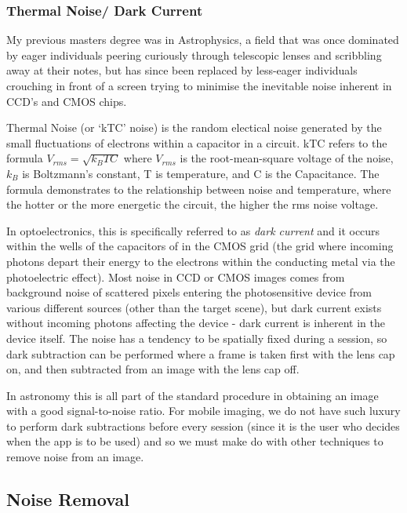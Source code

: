 \documentclass[11pt]{article} %
\begin{document}
{{\subsubsection{Thermal Noise/ Dark Current}

My previous masters degree was in Astrophysics, a field that was once dominated by eager individuals peering curiously through telescopic lenses and scribbling away at their notes, but has since been replaced by less-eager individuals crouching in front of a screen trying to minimise the inevitable noise inherent in CCD’s and CMOS chips.

Thermal Noise (or ‘kTC’ noise) is the random electical noise generated by the small fluctuations of electrons within a capacitor in a circuit. kTC refers to the formula \(V_{rms}=\sqrt{k_BTC}\) where \(V_{rms}\) is the root-mean-square voltage of the noise, \(k_B\) is Boltzmann’s constant, T is temperature, and C is the Capacitance. The formula demonstrates to the relationship between noise and temperature, where the hotter or the more energetic the circuit, the higher the rms noise voltage.

In optoelectronics, this is specifically referred to as {\it dark current} and it occurs within the wells of the capacitors of in the CMOS grid (the grid where incoming photons depart their energy to the electrons within the conducting metal via the photoelectric effect). Most noise in CCD or CMOS images comes from background noise of scattered pixels entering the photosensitive device from various different sources (other than the target scene), but dark current exists without incoming photons affecting the device - dark current is inherent in the device itself.  The noise has a tendency to be spatially fixed during a session, so dark subtraction can be performed where a frame is taken first with the lens cap on, and then subtracted from an image with the lens cap off. 

In astronomy this is all part of the standard procedure in obtaining an image with a good signal-to-noise ratio. For mobile imaging, we do not have such luxury to perform dark subtractions before every session (since it is the user who decides when the app is to be used) and so we must make do with other techniques to remove noise from an image.

\subsection {Noise Removal}
}}
\end{document}
